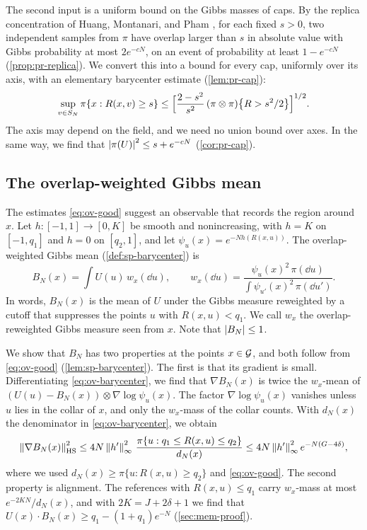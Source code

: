 The second input is a uniform bound on the Gibbs masses of caps. By the replica concentration of Huang, Montanari, and Pham \cite[Lemma~7.7]{HuangMontanariPham2024}, for each fixed $s>0$, two independent samples from $\pi$ have overlap larger than $s$ in absolute value with Gibbs probability at most $2e^{-cN}$, on an event of probability at least $1-e^{-cN}$ (\cref{prop:pr-replica}). We convert this into a bound for every cap, uniformly over its axis, with an elementary barycenter estimate (\cref{lem:pr-cap}):
\begin{equation}\label{eq:ov-cap}
\sup_{v\in S_N}\pi\{x:R(x,v)\ge s\}\le\Bigl[\frac{2-s^2}{s^2}\,(\pi\otimes\pi)\bigl\{R>s^2/2\bigr\}\Bigr]^{1/2}.
\end{equation}
The axis may depend on the field, and we need no union bound over axes. In the same way, we find that $\left|\pi(U)\right|^2\le s+e^{-cN}$ (\cref{cor:pr-cap}).

\subsection{The overlap-weighted Gibbs mean}\label{sec:ov-barycenter}

The estimates \eqref{eq:ov-good} suggest an observable that records the region around $x$. Let $h\colon[-1,1]\to[0,K]$ be smooth and nonincreasing, with $h=K$ on $[-1,q_1]$ and $h=0$ on $[q_2,1]$, and let $\psi_u(x)=e^{-Nh(R(x,u))}$. The overlap-weighted Gibbs mean (\cref{def:sp-barycenter}) is
\begin{equation}\label{eq:ov-barycenter}
B_N(x)=\int U(u)\,w_x(\dd u),\qquad w_x(\dd u)=\frac{\psi_u(x)^2\,\pi(\dd u)}{\int\psi_{u'}(x)^2\,\pi(\dd u')}.
\end{equation}
In words, $B_N(x)$ is the mean of $U$ under the Gibbs measure reweighted by a cutoff that suppresses the points $u$ with $R(x,u)<q_1$. We call $w_x$ the overlap-reweighted Gibbs measure seen from $x$. Note that $\left|B_N\right|\le1$.

We show that $B_N$ has two properties at the points $x\in\mathcal G$, and both follow from \eqref{eq:ov-good} (\cref{lem:sp-barycenter}). The first is that its gradient is small. Differentiating \eqref{eq:ov-barycenter}, we find that $\nabla B_N(x)$ is twice the $w_x$-mean of $(U(u)-B_N(x))\otimes\nabla\log\psi_u(x)$. The factor $\nabla\log\psi_u(x)$ vanishes unless $u$ lies in the collar of $x$, and only the $w_x$-mass of the collar counts. With $d_N(x)$ the denominator in \eqref{eq:ov-barycenter}, we obtain
\begin{equation}\label{eq:ov-gradient}
\left\lVert\nabla B_N(x)\right\rVert_{\rm HS}^2\le4N\left\lVert h'\right\rVert_\infty^2\,\frac{\pi\{u:q_1\le R(x,u)\le q_2\}}{d_N(x)}\le4N\left\lVert h'\right\rVert_\infty^2e^{-N(G-4\delta)},
\end{equation}
where we used $d_N(x)\ge\pi\{u:R(x,u)\ge q_2\}$ and \eqref{eq:ov-good}. The second property is alignment. The references with $R(x,u)\le q_1$ carry $w_x$-mass at most $e^{-2KN}/d_N(x)$, and with $2K=J+2\delta+1$ we find that $U(x)\cdot B_N(x)\ge q_1-(1+q_1)e^{-N}$ (\cref{sec:mem-proof}).

